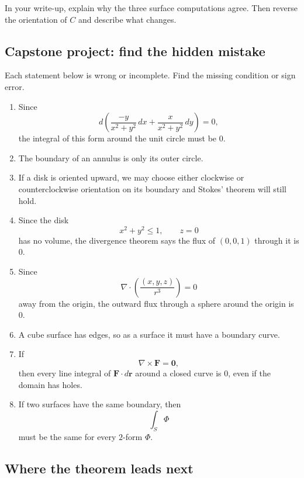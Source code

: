 In your write-up, explain why the three surface computations agree.  Then reverse the
orientation of \(C\) and describe what changes.

\subsection{Capstone project: find the hidden mistake}

Each statement below is wrong or incomplete.  Find the missing condition or sign error.

\begin{enumerate}
\item Since
\[
    d\left(
    \frac{-y}{x^2+y^2}\,dx+
    \frac{x}{x^2+y^2}\,dy
    \right)=0,
\]
the integral of this form around the unit circle must be \(0\).

\item The boundary of an annulus is only its outer circle.

\item If a disk is oriented upward, we may choose either clockwise or counterclockwise
orientation on its boundary and Stokes' theorem will still hold.

\item Since the disk
\[
    x^2+y^2\le1,\qquad z=0
\]
has no volume, the divergence theorem says the flux of \((0,0,1)\) through it is \(0\).

\item Since
\[
    \nabla\cdot\left(\frac{(x,y,z)}{r^3}\right)=0
\]
away from the origin, the outward flux through a sphere around the origin is \(0\).

\item A cube surface has edges, so as a surface it must have a boundary curve.

\item If
\[
    \nabla\times\mathbf F=\mathbf 0,
\]
then every line integral of \(\mathbf F\cdot d\mathbf r\) around a closed curve is \(0\),
even if the domain has holes.

\item If two surfaces have the same boundary, then
\[
    \int_S \Phi
\]
must be the same for every \(2\)-form \(\Phi\).
\end{enumerate}

\subsection{Where the theorem leads next}

